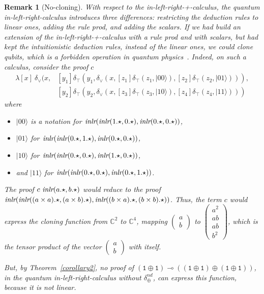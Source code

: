 \documentclass[screen, sigconf,authorversion,nonacm]{acmart}
\theoremstyle{acmdefinition}
\newtheorem{remark}[theorem]{Remark}}
\numberwithin{equation}{section}
\newcommand\ket[1]{\ensuremath{|{#1}\rangle}}
\newcommand\abstr[1]{[#1]}
\newcommand\inlr{\mbox{\it inlr}}
\newcommand\elimtop{\delta_{\top}}
\newcommand\elimor{\delta_{\vee}}
\newcommand\one{\ensuremath{\mathtt 1}}
\newcommand\elimplus{\delta_{\oplus}}
\begin{document}
\begin{remark}[No-cloning]
With respect to the in-left-right-+-calculus, the quantum
in-left-right-calculus introduces three differences: 
restricting the deduction rules to linear ones,
adding the rule prod, and
adding the scalars. 
If we had build an extension of the
in-left-right-+-calculus with a rule prod and with scalars, but had
kept the intuitionistic deduction rules, instead of the linear ones,
we could clone qubits, which is a forbidden operation in quantum
physics~\cite{WoottersZurekNature82}. Indeed, on such a calculus,
consider the proof $c$
\begin{align*}
\lambda \abstr{x}~\elimor(x, 
    &\abstr{y_1} \elimtop(y_1,\elimor(x, \abstr{z_1} \elimtop(z_1,\ket{00}),\abstr{z_2} \elimtop(z_2,\ket{01}))), \\
    &\abstr{y_2} \elimtop(y_2,\elimor(x, \abstr{z_3} \elimtop(z_3,\ket{10}), \abstr{z_4} \elimtop(z_4,\ket{11})))
\end{align*}
where
\begin{itemize}
\item $\ket{00}$ is a notation for
  $\inlr(\inlr(1.\star,0.\star),\inlr(0.\star,0.\star))$,
\item $\ket{01}$ for
  $\inlr(\inlr(0.\star,1.\star),\inlr(0.\star,0.\star))$,
\item $\ket{10}$ for
  $\inlr(\inlr(0.\star,0.\star),\inlr(1.\star,0.\star))$,
\item and $\ket{11}$ for
  $\inlr(\inlr(0.\star,0.\star),\inlr(0.\star,1.\star))$.
\end{itemize}
The proof $c~\inlr(a.\star,b.\star)$ would reduce to the proof
$\inlr(\inlr((a \times a).\star,(a\times b).\star),\inlr((b \times
a).\star, (b \times b).\star))$. Thus, the term $c$ would express the
cloning function from ${\mathbb C}^2$ to ${\mathbb C}^4$, mapping
$\left(\begin{smallmatrix} a\\b\end{smallmatrix}\right)$ to
$\left(\begin{smallmatrix} a^2\\ab\\ab\\b^2\end{smallmatrix}\right)$,
which is the tensor product of the vector $\left(\begin{smallmatrix}
  a\\b\end{smallmatrix}\right)$ with itself.

But, by Theorem~\ref{corollary2}, no proof of $(\one \oplus \one)
\multimap ((\one \oplus \one) \oplus (\one \oplus \one))$, in the
quantum in-left-right-calculus without $\elimplus^{nd}$, can express
this function, because it is not linear.
\end{remark}
\end{document}
